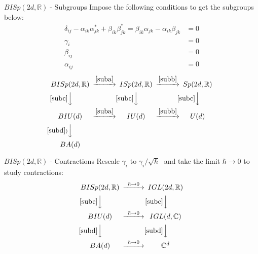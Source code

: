 \documentclass[pdf,colorBG,slideColor,fyma]{prosper}
\def\IC{\mathbb{C}}
\def\IR{\mathbb{R}}
\def\BISp{$BISp(2d, \IR)\;$}
\begin{document}
\begin{slide}{\BISp - Subgroups}
Impose the following conditions to get the subgroups below:
\begin{subequations}
\begin{align}
\delta_{ij} - \alpha_{ik}\alpha^*_{jk} + \beta_{ik} \beta^*_{jk} = \beta_{ik} \alpha_{jk} - \alpha_{ik} \beta_{jk} & = 0 \label{suba}\\
\gamma_i &= 0  \label{subb}\\
\beta_{ij} &= 0  \label{subc}\\
\alpha_{ij} &= 0 \label{subd}
\end{align}
\end{subequations}
    \[
    \begin{CD}
    {BISp(2d, \IR)} @>\eqref{suba}>> {ISp(2d, \IR)} @>\eqref{subb}>> {Sp(2d, \IR)} \\
    @V\eqref{subc}VV @V\eqref{subc}VV @V\eqref{subc}VV \\
    {BIU(d)} @>\eqref{suba}>> {IU(d)} @>\eqref{subb}>> {U(d)} \\
    @V\eqref{subd})VV \\
    {BA(d)}
    \end{CD}
    \]
\end{slide}


\begin{slide}{\BISp - Contractions}
Rescale $\gamma_i$ to $\gamma_i/\sqrt{\hbar}\;$ and take the limit
$\hbar \rightarrow 0$ to study contractions:
    \[
    \begin{CD}
    {BISp(2d, \IR)} @>\hbar \rightarrow 0>> {IGL(2d, \IR)} \\
    @V\eqref{subc}VV @V\eqref{subc}VV \\
    {BIU(d)} @>\hbar \rightarrow 0>> {IGL(d, \IC)} \\
    @V\eqref{subd}VV @V\eqref{subd}VV \\
    {BA(d)} @>\hbar \rightarrow 0>> {\IC^d}
    \end{CD}
    \]
\end{slide}

\end{document}
